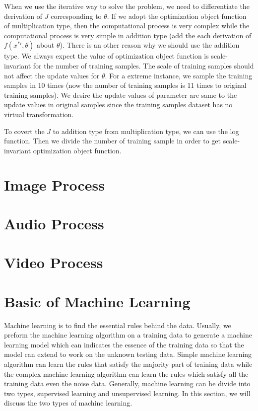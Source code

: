 \documentclass[runningheads,openany]{xhlPaper}
\begin{document}
When we use the iterative way to solve the problem, we need to differentiate the derivation of $J$ corresponding to $\theta$. If we adopt the optimization object function of multiplication type, then the computational process is very complex while the computational process is very simple in addition type (add the each derivation of $f\left( {{x^{* i}},\theta } \right)$ about $\theta$). There is an other reason why we should use the addition type. We always expect the value of optimization object function is scale-invariant for the number of training samples. The scale of training samples should not affect the update values for $\theta$. For a extreme instance, we sample the training samples in 10 times (now the number of training samples is 11 times to original training samples). We desire the update values of parameter are same to the update values in original samples since the training samples dataset has no virtual transformation.

To covert the $J$ to addition type from multiplication type, we can use the log function. Then we divide the number of training sample in order to get scale-invariant optimization object function.

\chapter{Image Process}
\chapter{Audio Process}
\chapter{Video Process}

\chapter{Basic of Machine Learning}
Machine learning is to find the essential rules behind the data. 
Usually, we preform the machine learning algorithm on a training data to generate a machine learning model which can indicates the essence of the training data so that the model can extend to work on the unknown testing data. 
Simple machine learning algorithm can learn the rules that satisfy the majority part of training data while the complex machine learning algorithm can learn the rules which satisfy all the training data even the noise data.
Generally, machine learning can be divide into two types, supervised learning and unsupervised learning. In this section, we will discuss the two types of machine learning.
\end{document}
